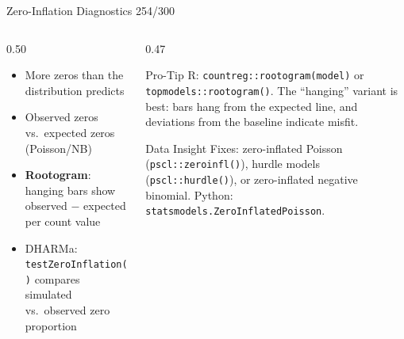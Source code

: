 \documentclass[10pt]{beamer}
\newcommand{\smark}[1]{\hfill{\scriptsize\color{codegray}#1}}
\begin{document}
\begin{frame}{Zero-Inflation Diagnostics}
\smark{254/300}
\begin{columns}[T]
\begin{column}{0.50\textwidth}
\begin{itemize}
    \item More zeros than the distribution predicts
    \item Observed zeros vs.\ expected zeros (Poisson/NB)
    \item \textbf{Rootogram}: hanging bars show observed $-$ expected per count value
    \item DHARMa: \texttt{testZeroInflation()} compares simulated vs.\ observed zero proportion
\end{itemize}
\end{column}
\begin{column}{0.47\textwidth}
\begin{alertblock}{Pro-Tip}
    \scriptsize R: \texttt{countreg::rootogram(model)} or \texttt{topmodels::rootogram()}. The ``hanging'' variant is best: bars hang from the expected line, and deviations from the baseline indicate misfit.
\end{alertblock}
\vspace{0.1cm}
\begin{exampleblock}{Data Insight}
    \scriptsize Fixes: zero-inflated Poisson (\texttt{pscl::zeroinfl()}), hurdle models (\texttt{pscl::hurdle()}), or zero-inflated negative binomial. Python: \texttt{statsmodels.ZeroInflatedPoisson}.
\end{exampleblock}
\end{column}
\end{columns}
\end{frame}
\end{document}
